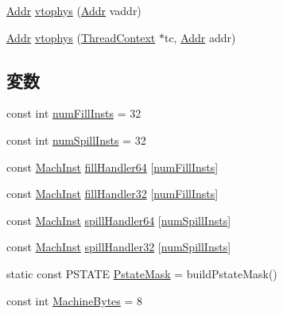 \begin{DoxyCompactItemize}
\item 
\hyperlink{base_2types_8hh_af1bb03d6a4ee096394a6749f0a169232}{Addr} \hyperlink{namespaceSparcISA_a3828815371ad2b0a1be60abdcb405cf9}{vtophys} (\hyperlink{base_2types_8hh_af1bb03d6a4ee096394a6749f0a169232}{Addr} vaddr)
\item 
\hyperlink{base_2types_8hh_af1bb03d6a4ee096394a6749f0a169232}{Addr} \hyperlink{namespaceSparcISA_af1014ad6d87b8a97e9d660234574a565}{vtophys} (\hyperlink{classThreadContext}{ThreadContext} $\ast$tc, \hyperlink{base_2types_8hh_af1bb03d6a4ee096394a6749f0a169232}{Addr} addr)
\end{DoxyCompactItemize}
\subsection*{変数}
\begin{DoxyCompactItemize}
\item 
const int \hyperlink{namespaceSparcISA_a41cabe542f53b98458790511452d62ec}{numFillInsts} = 32
\item 
const int \hyperlink{namespaceSparcISA_a2e68c763f4f92cca75cbbbad7d0ee75f}{numSpillInsts} = 32
\item 
const \hyperlink{namespaceSparcISA_a301c22ea09fa33dcfe6ddf22f203699c}{MachInst} \hyperlink{namespaceSparcISA_a85197bb01eb016d70239c26406fbfe6b}{fillHandler64} \mbox{[}\hyperlink{namespaceSparcISA_a41cabe542f53b98458790511452d62ec}{numFillInsts}\mbox{]}
\item 
const \hyperlink{namespaceSparcISA_a301c22ea09fa33dcfe6ddf22f203699c}{MachInst} \hyperlink{namespaceSparcISA_aa06e86caff101a9cb8f31cb6aa23e982}{fillHandler32} \mbox{[}\hyperlink{namespaceSparcISA_a41cabe542f53b98458790511452d62ec}{numFillInsts}\mbox{]}
\item 
const \hyperlink{namespaceSparcISA_a301c22ea09fa33dcfe6ddf22f203699c}{MachInst} \hyperlink{namespaceSparcISA_a2ac6be3d632ad25c90e12c201bf1d1d1}{spillHandler64} \mbox{[}\hyperlink{namespaceSparcISA_a2e68c763f4f92cca75cbbbad7d0ee75f}{numSpillInsts}\mbox{]}
\item 
const \hyperlink{namespaceSparcISA_a301c22ea09fa33dcfe6ddf22f203699c}{MachInst} \hyperlink{namespaceSparcISA_a37105350a4e231a7132e2b7e18c52ce0}{spillHandler32} \mbox{[}\hyperlink{namespaceSparcISA_a2e68c763f4f92cca75cbbbad7d0ee75f}{numSpillInsts}\mbox{]}
\item 
static const PSTATE \hyperlink{namespaceSparcISA_a8f97dccd23b5a80b78a87d1a97178072}{PstateMask} = buildPstateMask()
\item 
const int \hyperlink{namespaceSparcISA_a8f4ba87c53caab23396d3b86b672b0fb}{MachineBytes} = 8

\end{DoxyCompactItemize}
